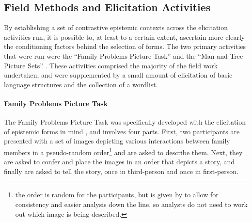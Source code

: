 \subsection{Field Methods and Elicitation Activities}
By establishing a set of contrastive epistemic contexts across the elicitation activities run, it is possible to, at least to a certain extent, ascertain more clearly the conditioning factors behind the selection of forms. The two primary activities that were run were the ``Family Problems Picture Task'' \cite{SanRoque2012a} and the ``Man and Tree Picture Sets'' \cite{Levinson1992}. These activities comprised the majority of the field work undertaken, and were supplemented by a small amount of elicitation of basic language structures and the collection of a wordlist.

\paragraph{Family Problems Picture Task}\label{p:Methods:FamilyProblems}
The Family Problems Picture Task was specifically developed with the elicitation of epistemic forms in mind \cite{SanRoque2012a}, and involves four parts. First, two participants are presented with a set of images \cite{Carroll2009} depicting various interactions between family members in a pseudo-random order\footnote{the order is random for the participants, but is given by  to allow for consistency and easier analysis down the line, so analysts do not need to work out which image is being described.} and are asked to describe them. Next, they are asked to confer and place the images in an order that depicts a story, and finally are asked to tell the story, once in third-person and once in first-person.

